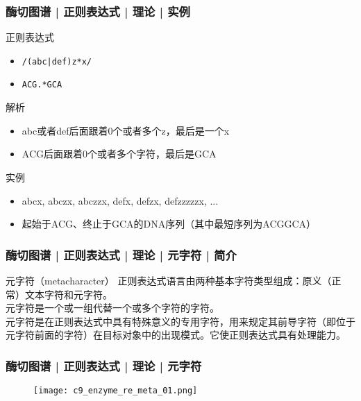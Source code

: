 \begin{frame}[fragile]
  \frametitle{酶切图谱 | 正则表达式 | 理论 | \alert{实例}}
  \begin{block}{正则表达式}
    \begin{itemize}
      \item<1-> \verb=/(abc|def)z*x/=
      \item<3-> \verb=ACG.*GCA=
    \end{itemize}
  \end{block}
  \begin{block}{解析}
    \begin{itemize}
      \item<2-> abc或者def后面跟着0个或者多个z，最后是一个x
      \item<4-> ACG后面跟着0个或者多个字符，最后是GCA
    \end{itemize}
  \end{block}
  \begin{block}{实例}
    \begin{itemize}
      \item<2-> abcx, abczx, abczzx, defx, defzx, defzzzzzx, ...
      \item<4-> 起始于ACG、终止于GCA的DNA序列（其中最短序列为ACGGCA）
    \end{itemize}
  \end{block}
\end{frame}

\begin{frame}
  \frametitle{酶切图谱 | 正则表达式 | 理论 | 元字符 | 简介}
  \begin{block}{元字符（metacharacter）}
    正则表达式语言由两种基本字符类型组成：原义（正常）文本字符和元字符。\\
    \vspace{1em}
    \alert{元字符是一个或一组代替一个或多个字符的字符。}\\
    \vspace{1em}
    元字符是在正则表达式中具有特殊意义的专用字符，用来规定其前导字符（即位于元字符前面的字符）在目标对象中的出现模式。它使正则表达式具有处理能力。
  \end{block}
\end{frame}

\begin{frame}
  \frametitle{酶切图谱 | 正则表达式 | 理论 | \alert{元字符}}
  \begin{figure}
    \centering
    \texttt{[image: c9\_enzyme\_re\_meta\_01.png]}
  \end{figure}
\end{frame}

